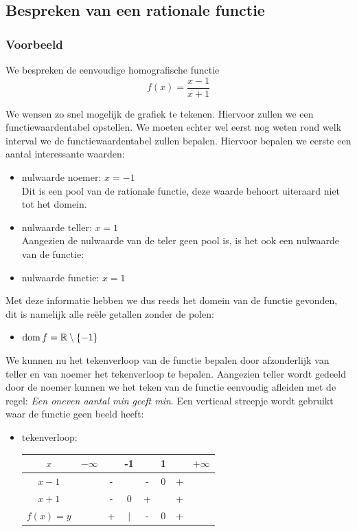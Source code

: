 \documentclass[12pt]{article}
\begin{document}
\pagebreak
\subsection{Bespreken van een rationale functie}
\subsubsection*{Voorbeeld}
We bespreken de eenvoudige homografische functie
$$f(x)=\frac{x-1}{x+1}$$

We wensen zo snel mogelijk de grafiek te tekenen. Hiervoor zullen we een functiewaardentabel opstellen. We moeten echter wel eerst nog weten rond welk interval we de functiewaardentabel zullen bepalen. Hiervoor bepalen we eerste een aantal interessante waarden:

\begin{itemize}
  \item nulwaarde noemer: $x=-1$\\
  Dit is een pool van de rationale functie, deze waarde behoort uiteraard niet tot het domein.
  \item nulwaarde teller: $x=1$\\
  Aangezien de nulwaarde van de teler geen pool is, is het ook een nulwaarde van de functie:
  \item nulwaarde functie: $x=1$\\  
\end{itemize}

Met deze informatie hebben we dus reeds het domein van de functie gevonden, dit is namelijk alle reële getallen zonder de polen:
\begin{itemize}
  \item $\dom f= \mathbb{R}\setminus \{-1\}$
\end{itemize}

We kunnen nu het tekenverloop van de functie bepalen door afzonderlijk van teller en van noemer het tekenverloop te bepalen. Aangezien teller wordt gedeeld door de noemer kunnen we het teken van de functie eenvoudig afleiden met de regel: {\em Een oneven aantal min geeft min}. Een verticaal streepje wordt gebruikt waar de functie geen beeld heeft:

\begin{itemize}
  \item tekenverloop:
  \begin{center}
    \begin{tabular}{c|ccccccc}
    $x$ & $-\infty$ & & -1 & & 1 & & $+\infty$\\   
    \hline
    $x-1$ & & - &   & - & 0 & + & \\
    $x+1$ & & - & 0 & + &   & + & \\
    \hline
    $f(x)=y$ & & + & $|$ & - & 0 & +
    \end{tabular}
  \end{center}
\end{itemize}
\end{document}

